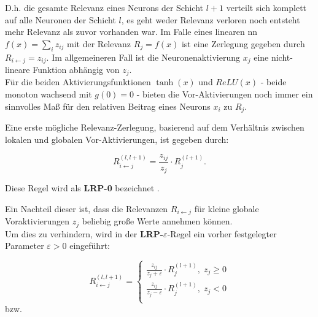 \documentclass[twoside, 12pt,a4paper]{book}
\numberwithin{equation}{section}
\begin{document}
	\noindent D.h. die gesamte Relevanz eines Neurons der Schicht $l+1$ verteilt sich komplett auf alle Neuronen der Schicht $l$, es geht weder Relevanz verloren noch entsteht mehr Relevanz als zuvor vorhanden war.
	Im Falle eines linearen \ac{nn} $f(x) = \sum_i{z_{ij}}$ mit der Relevanz $R_j = f(x)$ ist eine Zerlegung gegeben durch $R_{i\leftarrow j} = z_{ij}.$
	Im allgemeineren Fall ist die Neuronenaktivierung $x_j$ eine nicht-lineare Funktion abhängig von $z_j$.\\
	\noindent Für die beiden Aktivierungsfunktionen $\tanh(x)$ und $ReLU(x)$ - beide monoton wachsend mit $g(0)=0$ - bieten die Vor-Aktivierungen noch immer ein sinnvolles Maß für den relativen Beitrag eines Neurons $x_i$ zu $R_j$.
	
	\noindent Eine erste mögliche Relevanz-Zerlegung, basierend auf dem Verhältnis zwischen lokalen und globalen Vor-Aktivierungen, ist gegeben durch:
	
	\begin{equation}
	R_{i\leftarrow j}^{(l,l+1)} = \frac{z_{ij}}{z_j} \cdot R_j^{(l+1)}. \label{eq:lrp_regel}
	\end{equation}

	Diese Regel wird als \textbf{LRP-0} bezeichnet \cite{LRP_DNN}.
	
	\noindent Ein Nachteil dieser ist, dass die Relevanzen $R_{i \leftarrow j}$ für kleine globale Voraktivierungen $z_j$ beliebig große Werte annehmen können.\\
	
	\noindent Um dies zu verhindern, wird in der \textbf{LRP-$\varepsilon$}-Regel ein vorher festgelegter Parameter $\varepsilon > 0$ eingeführt:
	
	\begin{equation}
	R_{i\leftarrow j}^{(l,l+1)} = \begin{cases}
	\frac{z_{ij}}{z_j +\varepsilon} \cdot R_j^{(l+1)}, \; z_j \geq 0\\
	\frac{z_{ij}}{z_j -\varepsilon}\cdot R_j^{(l+1)}, \; z_j < 0\\
	\end{cases}
	\end{equation}
	bzw.
	
\end{document}
